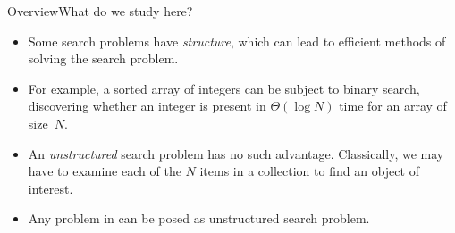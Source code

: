 
\begin{frame}{Overview}{What do we study here?}

\begin{itemize}
    \item Some search problems have \emph{structure}, which can lead to efficient methods of solving the search problem.
    \item For example, a sorted array of integers can be subject to binary search, discovering whether an integer is present in $\Theta(\log{N})$ time for an array of size~$N$.
    \item An \emph{unstructured} search problem has no such advantage.  Classically, we may have to examine each of the $N$ items in a collection to find an object of interest.
    \item Any problem in \href{https://complexityzoo.net/Complexity_Zoo:N\#np}{} can be posed as unstructured search problem.
\end{itemize}
    
\end{frame}

